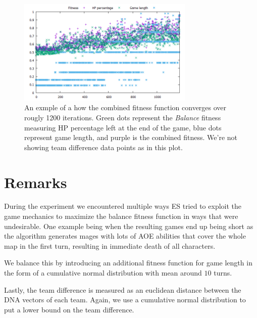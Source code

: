 \begin{figure}
	\centering
	\includegraphics[width=0.75\textwidth]{img/converging-es.png}
	\caption{An exmple of a how the combined fitness function converges over rougly 1200 iterations. Green dots represent the \emph{Balance} fitness measuring HP percentage left at the end of the game, blue dots represent game length, and purple is the combined fitness. We're not showing team difference data points as in this plot.}
	\label{fig:converging-es}	
\end{figure}

\section{Remarks}

During the experiment we encountered multiple ways ES tried to exploit the
game mechanics to maximize the balance fitness function in ways that were
undesirable. One example being when the resulting games end up being short
as the algorithm generates mages with lots of AOE abilities that cover the
whole map in the first turn, resulting in immediate death of all characters.

We balance this by introducing an additional fitness function for game length
in the form of a cumulative normal distribution with mean around $10$ turns.

Lastly, the team difference is measured as an euclidean distance between the DNA
vectors of each team. Again, we use a cumulative normal distribution to put a lower
bound on the team difference.
